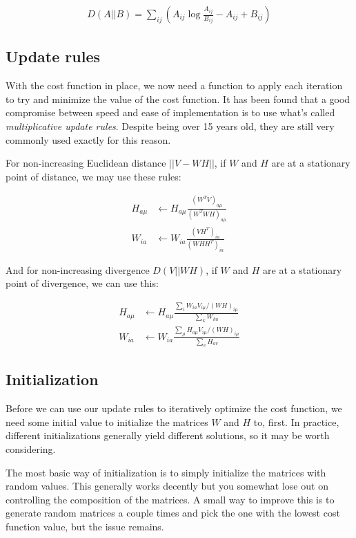\begin{align}
D(A||B) = \sum_{ij} \left( A_{ij} \log \frac{A_{ij}}{B_{ij}} - A_{ij} + B_{ij} \right)
\end{align}

\subsection{Update rules}
With the cost function in place, we now need a function to apply each iteration to try and minimize the value of the cost function. It has been found that a good compromise between speed and ease of implementation is to use what's called \emph{multiplicative update rules}. \cite{nmf_algorithms} Despite being over 15 years old, they are still very commonly used exactly for this reason.

For non-increasing Euclidean distance $||V - WH||$, if $W$ and $H$ are at a stationary point of distance, we may use these rules:

\begin{align}
\label{equ:update_euc}
H_{a \mu} & \leftarrow H_{a \mu} \frac{(W^TV)_{a \mu}}{(W^TWH)_{a \mu}} \\
W_{ia} & \leftarrow W_{ia} \frac{(VH^T)_{ia}}{(WHH^T)_{ia}}
\end{align}

And for non-increasing divergence $D(V||WH)$, if $W$ and $H$ are at a stationary point of divergence, we can use this:

\begin{align}
H_{a \mu} & \leftarrow H_{a \mu} \frac{\sum_i W_{ia} V_{i \mu} / (WH)_{i \mu}}{\sum_k W_{ka}} \\
W_{ia} & \leftarrow W_{ia} \frac{\sum_\mu H_{a \mu} V_{i \mu} / (WH)_{i \mu}}{\sum_v H_{av}}
\end{align}

\subsection{Initialization}
Before we can use our update rules to iteratively optimize the cost function, we need some initial value to initialize the matrices $W$ and $H$ to, first. In practice, different initializations generally yield different solutions, so it may be worth considering. \cite{naik_2015_nmf_advances}

The most basic way of initialization is to simply initialize the matrices with random values. This generally works decently but you somewhat lose out on controlling the composition of the matrices. A small way to improve this is to generate random matrices a couple times and pick the one with the lowest cost function value, but the issue remains.

